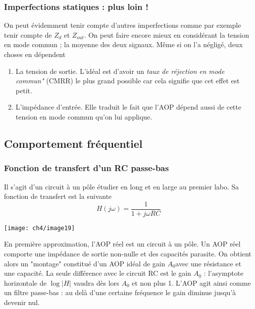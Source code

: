 		\subsubsection{Imperfections statiques : plus loin !}
		On peut évidemment tenir compte d'autres imperfections comme par exemple 
		tenir compte de $Z_d$ et $Z_{out}$. On peut faire encore mieux en considérant 
		la tension en mode commun ; la moyenne des deux signaux. Même si on l'a 
		négligé, deux choses en dépendent 
		\begin{enumerate}
		\item La tension de sortie. L'idéal est d'avoir un \textit{taux de réjection 
		en mode commun"} (CMRR) le plus grand possible car cela signifie que cet 
		effet est petit.
		\item L'impédance d'entrée. Elle traduit le fait que l'AOP dépend aussi de 
		cette tension en mode commun qu'on lui applique.
		\end{enumerate}
		
	\subsection{Comportement fréquentiel}
		\subsubsection{Fonction de transfert d'un RC passe-bas}
		Il s'agit d'un circuit à un pôle étudier en long et en large au premier labo. 
		Sa fonction de transfert est la suivante
		\begin{equation}
		H(j\omega) = \dfrac{1}{1+j\omega RC}
		\end{equation}
		\begin{center}
		\texttt{[image: ch4/image19]}
		\end{center}
		En première approximation, l'AOP réel est un circuit à un pôle. Un AOP réel 
		comporte une impédance de sortie non-nulle et des capacités parasite. On 
		obtient alors un "montage" constitué d'un AOP idéal de gain $A_0$avec une 
		résistance et une capacité. La seule différence avec le circuit RC est le 
		gain $A_0$ : l'asymptote horizontale de $\log|H|$ vaudra dès lors $A_0$ et 
		non plus 1. L'AOP agit ainsi comme un filtre passe-bas : au delà d'une 
		certaine fréquence le gain diminue jusqu'à devenir nul.\\
		
